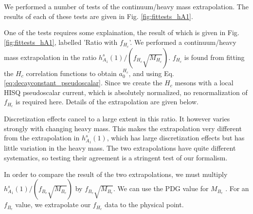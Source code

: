 We performed a number of tests of the continuum/heavy mass extrapolation. The results of each of these tests are given in Fig. \ref{fig:fittests_hA1}.

One of the tests requires some explaination, the result of which is given in Fig. \ref{fig:fittests_hA1}, labelled 'Ratio with $f_{H_c}$'. We performed a continuum/heavy mass extrapolation in the ratio $h_{A_1}^s(1)/(f_{H_c}\sqrt{M_{H_c}})$. $f_{H_c}$ is found from fitting the $H_c$ correlation functions to obtain $a_0^{H_c}$, and using Eq. \eqref{eq:decayconstant_pseudoscalar}. Since we create the $H_c$ mesons with a local HISQ pseudoscalar current, which is absolutely normalized, no renormalization of $f_{H_c}$ is required here. Details of the extrapolation are given below.

Discretization effects cancel to a large extent in this ratio. It however varies strongly with changing heavy mass. This makes the extrapolation very different from the extrapolation in $h_{A_1}^s(1)$, which has large discretization effects but has little variation in the heavy mass. The two extrapolations have quite different systematics, so testing their agreement is a stringent test of our formalism.

In order to compare the result of the two extrapolations, we must multiply $h_{A_1}^s(1)/(f_{B_c}\sqrt{M_{B_c}})$ by $f_{B_c}\sqrt{M_{B_c}}$. We can use the PDG value for $M_{B_c}$ \cite{PhysRevD.98.030001}. For an $f_{B_c}$ value, we extrapolate our $f_{H_c}$ data to the physical point.

